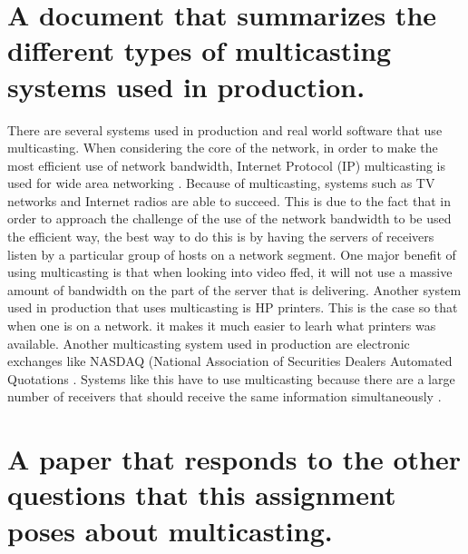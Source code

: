 \documentclass{article}
\begin{document}
\section{A document that summarizes the different types of multicasting systems used in production.}

There are several systems used in production and real world software that use multicasting. When considering the core of the network, in order to make the most efficient use of network bandwidth, Internet Protocol (IP) multicasting is used for wide area networking \cite{Dutta:2002:MSS:570705.570717}.  Because of multicasting, systems such as TV networks and Internet radios are able to succeed. This is due to the fact that in order to approach the challenge of the use of the network bandwidth to be used the efficient way, the best way to do this is by having the servers of receivers listen by a particular group of hosts on a network segment. One major benefit of using multicasting is that when looking into video ffed, it will not use a massive amount of bandwidth on the part of the server that is delivering. Another system used in production that uses multicasting is HP printers. This is the case so that when one is on a network. it makes it much easier to learh what printers was available. Another multicasting system used in production are electronic exchanges like NASDAQ (National Association of Securities Dealers Automated Quotations \citep{2001:IMS:380749.380771}. Systems like this have to use multicasting because there are a large number of receivers that should receive the same information simultaneously \citep{2001:IMS:380749.380771}.


\section{A paper that responds to the other questions that this assignment poses about multicasting.}

\end{document}
